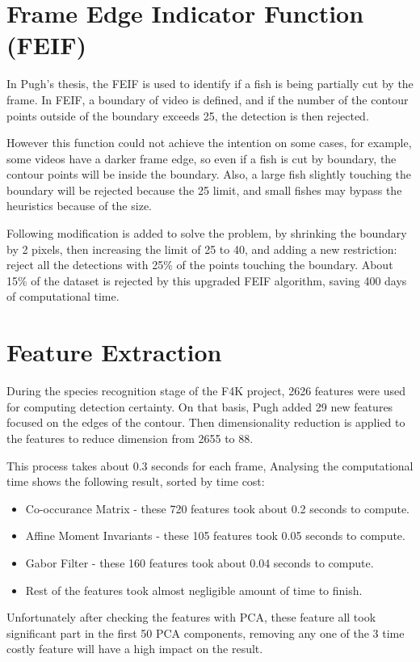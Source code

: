 \documentclass[bsc,logo,twoside,fullspacing,parskip]{infthesis}
\begin{document}
\section{Frame Edge Indicator Function (FEIF)}

In Pugh's thesis\cite{P1}, the FEIF is used to identify if a fish is being partially cut by the frame. In FEIF, a boundary of video is defined, and if the number of the contour points outside of the boundary exceeds 25, the detection is then rejected.

However this function could not achieve the intention on some cases, for example, some videos have a darker frame edge, so even if a fish is cut by boundary, the contour points will be inside the boundary. Also, a large fish slightly touching the boundary will be rejected because the 25 limit, and small fishes may bypass the heuristics because of the size.

Following modification is added to solve the problem, by shrinking the boundary by 2 pixels, then increasing the limit of 25 to 40, and adding a new restriction: reject all the detections with 25\% of the points touching the boundary. About 15\% of the dataset is rejected by this upgraded FEIF algorithm, saving 400 days of computational time.

\section{Feature Extraction}

During the species recognition stage of the F4K project, 2626 features were used for computing detection certainty. 
On that basis, Pugh added 29 new features focused on the edges of the contour. Then dimensionality reduction is applied to the features to reduce dimension from 2655 to 88. 

This process takes about 0.3 seconds for each frame, Analysing the computational time shows the following result, sorted by time cost:
\begin{itemize}
\item
Co-occurance Matrix - these 720 features took about 0.2 seconds to compute.
\item
Affine Moment Invariants - these 105 features took 0.05 seconds to compute.
\item
Gabor Filter - these 160 features took about 0.04 seconds to compute.
\item
Rest of the features took almost negligible amount of time to finish.
\end{itemize}
Unfortunately after checking the features with PCA, these feature all took significant part in the first 50 PCA components, removing any one of the 3 time costly feature will have a high impact on the result.
\end{document}
